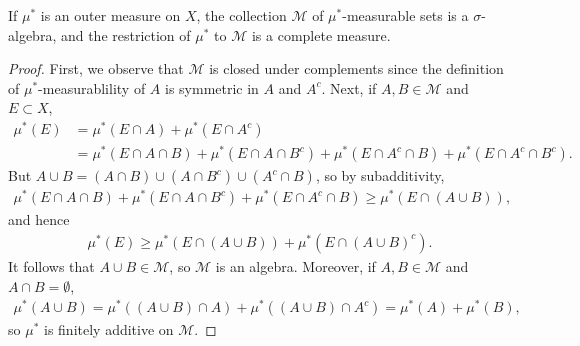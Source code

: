 \begin{theorem}
    If $\mu^*$ is an outer measure on $X$, the collection $\mathcal{M}$ of $\mu^*$-measurable sets is a $\sigma$-algebra, and the restriction of $\mu^*$ to $\mathcal{M}$ is a complete measure.
\end{theorem}

\begin{proof}
    First, we observe that $\mathcal{M}$ is closed under complements since the definition of $\mu^*$-measurablility of $A$ is symmetric in $A$ and $A^c$.
    Next, if $A, B \in \mathcal{M}$ and $E \subset X$,
    \begin{align}
        \mu^*(E) &= \mu^*(E \cap A) + \mu^*(E \cap A^c) \\
        &= \mu^*(E \cap A \cap B) + \mu^*(E \cap A \cap B^c) + \mu^*(E \cap A^c \cap B) + \mu^*(E \cap A^c \cap B^c).
    \end{align}
    But $A\cup B = (A \cap B) \cup (A \cap B^c) \cup (A^c \cap B)$, so by subadditivity,
    \begin{align}
        \mu^*(E \cap A \cap B) + \mu^*(E \cap A \cap B^c) + \mu^*(E \cap A^c \cap B) \ge \mu^*(E \cap (A \cup B)),
    \end{align}
    and hence 
    \begin{align}
        \mu^*(E) \ge \mu^*(E \cap (A \cup B)) + \mu^*(E \cap (A \cup B)^c).
    \end{align}
    It follows that $A \cup B \in \mathcal{M}$, so $\mathcal{M}$ is an algebra.
    Moreover, if $A, B \in \mathcal{M}$ and $A \cap B = \emptyset$, 
    \begin{align}
        \mu^*(A \cup B) = \mu^*((A \cup B) \cap A) + \mu^*((A \cup B) \cap A^c) = \mu^*(A) + \mu^*(B),
    \end{align}
    so $\mu^*$ is finitely additive on $\mathcal{M}$.


\end{proof}
